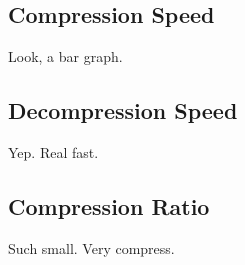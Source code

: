 \subsection{Compression Speed}

Look, a bar graph.


\subsection{Decompression Speed}

Yep. Real fast.

\subsection{Compression Ratio}

Such small. Very compress.

